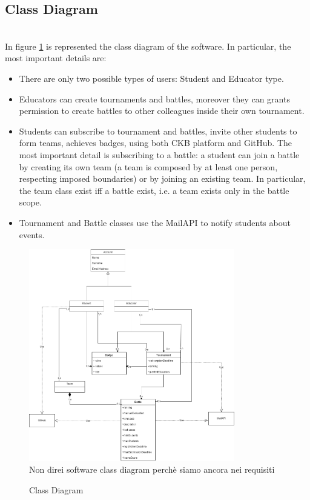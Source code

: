 \subsection{Class Diagram}
{\color{red}{AGGIUNGERE classe testcase. TOGLIERE TeamScore, è uguale a ranking in battle. Togliere creates battle da educator, ridondante}} \\
In figure \ref{fig:class-diagram} is represented the class diagram of the software. 
In particular, the most important details are:
\begin{itemize}
    \item There are only two possible types of users: Student and Educator type.
    \item Educators can create tournaments and battles, moreover they can grants permission to create battles to other colleagues inside their own tournament.
    \item Students can subscribe to tournament and battles, invite other students to form teams, achieves badges, using both CKB platform and GitHub. 
          The most important detail is subscribing to a battle: a student can join a battle by creating its own team (a team is composed by at least one person, respecting imposed boundaries) or by joining an existing team. 
          In particular, the team class exist iff a battle exist, i.e. a team exists only in the battle scope.
    \item Tournament and Battle classes use the MailAPI to notify students about events.
\end{itemize}

\begin{figure}[H]
    \centering
    \includegraphics[width=0.8\textwidth]{images/state_diagrams/ClassDiagram.png}
    \\ {\color{red} Non direi software class diagram perchè siamo ancora nei requisiti} \\
    \caption{Class Diagram}
    \label{fig:class-diagram}
\end{figure}

